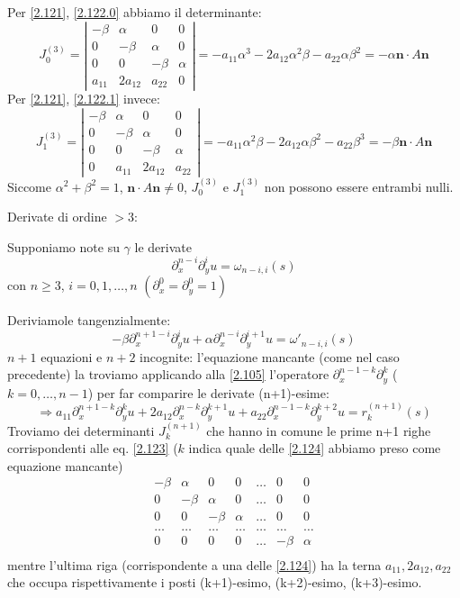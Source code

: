 \documentclass[a4paper,11pt]{report}
\newcommand{\vect}[1]{\boldsymbol{#1}}
\begin{document}
Per \eqref{2.121}, \eqref{2.122.0} abbiamo il determinante:
\[
J_0^{(3)}=\left|\begin{matrix}
-\beta & \alpha & 0 & 0\\
0 & -\beta & \alpha & 0 \\
0 & 0 & -\beta & \alpha \\
a_{11} & 2a_{12} & a_{22} & 0
\end{matrix}\right| =- a_{11}\alpha^3 - 2a_{12}\alpha^2\beta - a_{22}\alpha\beta^2 = -\alpha \vect{n}\cdot A \vect{n}
\]
Per \eqref{2.121}, \eqref{2.122.1} invece: 
\[
J_1^{(3)}=\left|\begin{matrix}
-\beta & \alpha & 0 & 0\\
0 & -\beta & \alpha & 0 \\
0 & 0 & -\beta & \alpha \\
0 & a_{11} & 2a_{12} & a_{22} 
\end{matrix}\right| = -a_{11}\alpha^2\beta - 2a_{12}\alpha\beta^2 - a_{22}\beta^3 = -\beta \vect{n}\cdot A \vect{n}
\]
Siccome $\alpha^2 + \beta^2 =1$, $\vect{n}\cdot A \vect{n}\neq 0$, $J_0^{(3)}$ e $J_1^{(3)}$ non possono essere entrambi nulli.

\smallskip

Derivate di ordine $>3$:

Supponiamo note su $\gamma$ le derivate
\[
\partial_x^{n-i}\partial_y^i u = \omega_{n-i,i} (s)
\]
con $n\geq 3$, $i=0,1,\dots, n$ $(\partial_x^0 = \partial_y^0 = 1)$

Deriviamole tangenzialmente:
\begin{equation}
-\beta \partial_x^{n+1-i}\partial_y^{i}u +\alpha \partial_x^{n-i}\partial_y^{i+1}u = \omega'_{n-i,i}(s)
\label{2.123}
\end{equation}
$n+1$ equazioni e $n+2$ incognite: l'equazione mancante (come nel caso precedente) la troviamo applicando alla \eqref{2.105} l'operatore $\partial_x^{n-1-k}\partial_y^k$ ($k=0,\dots,n-1$) per far comparire le derivate (n+1)-esime:
\begin{equation}
\Rightarrow a_{11}\partial_x^{n+1-k}\partial_y^k u + 2a_{12}\partial_x^{n-k}\partial_y^{k+1}u + a_{22} \partial_x^{n-1-k}\partial_y^{k+2}u = r_k^{(n+1)}(s) 
\label{2.124}
\end{equation}
Troviamo dei determinanti $J_k^{(n+1)}$ che hanno in comune le prime n+1 righe corrispondenti alle eq. \eqref{2.123}
($k$ indica quale delle \eqref{2.124} abbiamo preso come equazione mancante)
\[
\begin{matrix}
-\beta & \alpha & 0 & 0 & \dots & 0 & 0\\
0 & -\beta & \alpha & 0 & \dots & 0 & 0\\
0 & 0 &-\beta & \alpha  & \dots & 0 & 0\\
\dots & \dots & \dots & \dots & \dots & \dots & \dots \\
0 & 0 & 0 & 0 &  \dots & -\beta & \alpha\\
\end{matrix}
\]
mentre l'ultima riga (corrispondente a una delle \eqref{2.124}) ha la terna $ a_{11},2a_{12},a_{22}$ che occupa rispettivamente i posti (k+1)-esimo, (k+2)-esimo, (k+3)-esimo.
\end{document}
